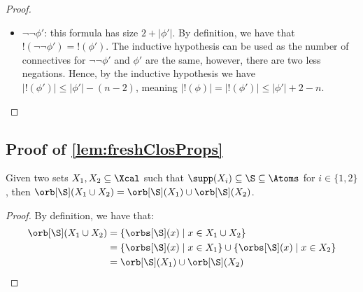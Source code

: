 \begin{proof}
\begin{itemize}
\begin{align*}
			&\le 2 + |\phi'| + |\vec u| - n
		\end{align*}
		A similar argument can be shown for $\lnot (\nu X(\vec x).\phi')(\vec u)$.
		\item $\lnot \lnot \phi'$: this formula has size $2 + |\phi'|$. 
		By definition, we have that $!(\lnot \lnot \phi') = !(\phi')$. 
		The inductive hypothesis can be used as the number of connectives for $\lnot \lnot \phi'$ and $\phi'$ are the same, however, there are two less negations. 
		Hence, by the inductive hypothesis we have $|!(\phi')| \le |\phi'| - (n - 2)$, 
		meaning $|!(\phi)| = |!(\phi')| \le |\phi'| + 2 - n $.
	\end{itemize}
%    
\end{proof}

\subsection{Proof of  \cref{lem:freshClosProps}}

\begin{lemma}\label{lem:unionOrb2}
	Given two sets $X_1,X_2\subseteq \Xcal$ such that $\supp(X_i) \subseteq \S \subseteq \Atoms$ for $i \in \{1, 2\}$,
	then $\orb[\S](X_1 \cup X_2) = \orb[\S](X_1) \cup \orb[\S](X_2)$.
\end{lemma}

\begin{proof}
	By definition, we have that:
	\begin{align*}
		\orb[\S](X_1 \cup X_2) &= \{\orbs[\S](x) \mid x \in X_1 \cup X_2\} 
		\\ &= \{\orbs[\S](x) \mid x \in X_1\} \cup \{\orbs[\S](x) \mid x \in X_2\} 
		\\ &= \orb[\S](X_1) \cup \orb[\S](X_2)    
	\end{align*}
\end{proof}


